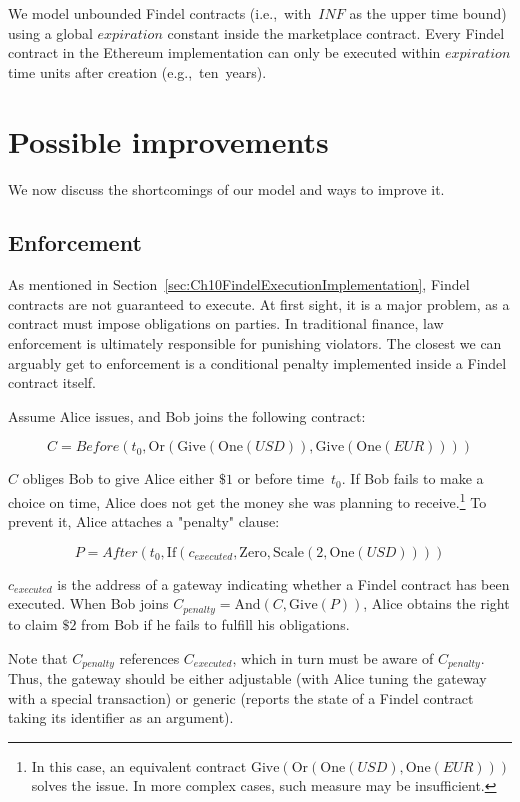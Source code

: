 We model unbounded Findel contracts (i.e.,~with~$INF$ as the upper time bound) using a global $expiration$ constant inside the marketplace contract.
Every Findel contract in the Ethereum implementation can only be executed within $expiration$ time units after creation (e.g.,~ten~years).



\section{Possible improvements}

We now discuss the shortcomings of our model and ways to improve it.

\subsection{Enforcement} \label{sec:Ch10FindelEnforcement}

As mentioned in Section~\ref{sec:Ch10FindelExecutionImplementation}, Findel contracts are not guaranteed to execute.
At first sight, it is a major problem, as a contract must impose obligations on parties.
In traditional finance, law enforcement is ultimately responsible for punishing violators.
The closest we can arguably get to enforcement is a conditional penalty implemented inside a Findel contract itself.

Assume Alice issues, and Bob joins the following contract:

\[C=Before(t_0,\mathrm{Or}(\mathrm{Give}(\mathrm{One}(USD)),\mathrm{Give}(\mathrm{One}(EUR))))\]

\(C\) obliges Bob to give Alice either $\$1$ or  before time~$t_0$.
If Bob fails to make a choice on time, Alice does not get the money she was planning to receive.\footnote{In this case, an equivalent contract \(\mathrm{Give}(\mathrm{Or}(\mathrm{One}(USD),\mathrm{One}(EUR)))\) solves the issue. In more complex cases, such measure may be insufficient.}
To prevent it, Alice attaches a "penalty" clause:

\[P=After(t_0,\mathrm{If}(c_{executed},\mathrm{Zero},\mathrm{Scale}(2,\mathrm{One}(USD))))\]

\(c_{executed}\) is the address of a gateway indicating whether a Findel contract has been executed.
When Bob joins \(C_{penalty}=\mathrm{And}(C,\mathrm{Give}(P))\), Alice obtains the right to claim $\$2$ from Bob if he fails to fulfill his obligations.

Note that \(C_{penalty}\) references \(C_{executed}\), which in turn must be aware of \(C_{penalty}\).
Thus, the gateway should be either adjustable (with Alice tuning the gateway with a special transaction) or generic (reports the state of a Findel contract taking its identifier as an argument).


